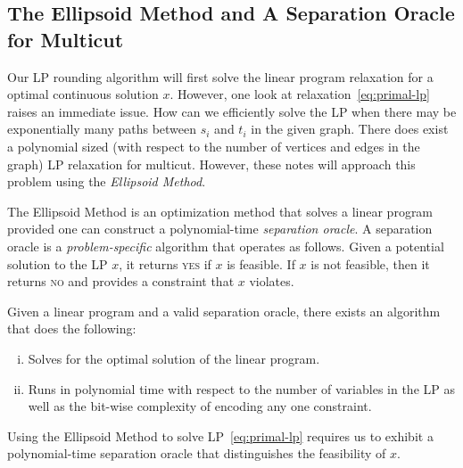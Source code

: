 \subsection{The Ellipsoid Method and A Separation Oracle for Multicut}

Our LP rounding algorithm will first solve the linear program relaxation for a optimal continuous solution $x$. However, one look at relaxation~\ref{eq:primal-lp} raises an immediate issue. How can we efficiently solve the LP when there may be exponentially many paths between $s_i$ and $t_i$ in the given graph. There does exist a polynomial sized (with respect to the number of vertices and edges in the graph) LP relaxation for multicut. However, these notes will approach this problem using the \emph{Ellipsoid Method}.

The Ellipsoid Method is an optimization method that solves a linear program provided one can construct a polynomial-time \emph{separation oracle}. A separation oracle is a \emph{problem-specific} algorithm that operates as follows. Given a potential solution to the LP $x$, it returns \textsc{yes} if $x$ is feasible. If $x$ is not feasible, then it returns \textsc{no} and provides a constraint that $x$ violates.
\begin{theorem}
Given a linear program and a valid separation oracle, there exists an algorithm that does the following:
\vspace{-1em}
\begin{enumerate}[i.]
\item Solves for the optimal solution of the linear program.
\item Runs in polynomial time with respect to the number of variables in the LP as well as the bit-wise complexity of encoding any one constraint.
\end{enumerate}
\end{theorem}

Using the Ellipsoid Method to solve LP~\ref{eq:primal-lp} requires us to exhibit a polynomial-time separation oracle that distinguishes the feasibility of $x$.


